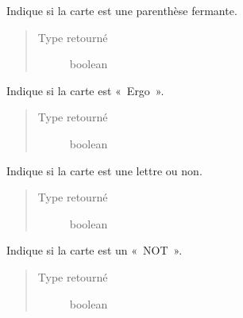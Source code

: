 \documentclass[letterpaper,10pt,french]{sphinxmanual}
\begin{document}
\begin{fulllineitems}
\begin{fulllineitems}
\end{fulllineitems}


\begin{fulllineitems}
\label{\detokenize{doc_classe:cards.Card.is_close}}
Indique si la carte est une parenthèse fermante.
\begin{quote}\begin{description}
\item[{Type retourné}] \leavevmode
boolean

\end{description}\end{quote}

\end{fulllineitems}


\begin{fulllineitems}
\label{\detokenize{doc_classe:cards.Card.is_ergo}}
Indique si la carte est « Ergo ».
\begin{quote}\begin{description}
\item[{Type retourné}] \leavevmode
boolean

\end{description}\end{quote}

\end{fulllineitems}


\begin{fulllineitems}
\label{\detokenize{doc_classe:cards.Card.is_letter}}
Indique si la carte est une lettre ou non.
\begin{quote}\begin{description}
\item[{Type retourné}] \leavevmode
boolean

\end{description}\end{quote}

\end{fulllineitems}


\begin{fulllineitems}
\label{\detokenize{doc_classe:cards.Card.is_not}}
Indique si la carte est un « NOT ».
\begin{quote}\begin{description}
\item[{Type retourné}] \leavevmode
boolean


\end{description}
\end{quote}
\end{fulllineitems}
\end{fulllineitems}
\end{document}
